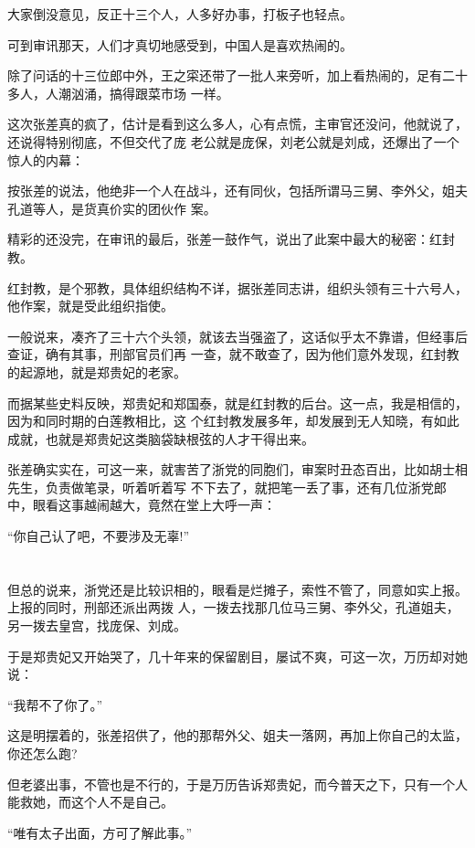 \documentclass[11pt,a4paper,onecolumn]{article}
\begin{document}
大家倒没意见，反正十三个人，人多好办事，打板子也轻点。

可到审讯那天，人们才真切地感受到，中国人是喜欢热闹的。

除了问话的十三位郎中外，王之寀还带了一批人来旁听，加上看热闹的，足有二十多人，人潮汹涌，搞得跟菜市场
一样。

这次张差真的疯了，估计是看到这么多人，心有点慌，主审官还没问，他就说了，还说得特别彻底，不但交代了庞
老公就是庞保，刘老公就是刘成，还爆出了一个惊人的内幕：

按张差的说法，他绝非一个人在战斗，还有同伙，包括所谓马三舅、李外父，姐夫孔道等人，是货真价实的团伙作
案。

精彩的还没完，在审讯的最后，张差一鼓作气，说出了此案中最大的秘密：红封教。

红封教，是个邪教，具体组织结构不详，据张差同志讲，组织头领有三十六号人，他作案，就是受此组织指使。

一般说来，凑齐了三十六个头领，就该去当强盗了，这话似乎太不靠谱，但经事后查证，确有其事，刑部官员们再
一查，就不敢查了，因为他们意外发现，红封教的起源地，就是郑贵妃的老家。

而据某些史料反映，郑贵妃和郑国泰，就是红封教的后台。这一点，我是相信的，因为和同时期的白莲教相比，这
个红封教发展多年，却发展到无人知晓，有如此成就，也就是郑贵妃这类脑袋缺根弦的人才干得出来。

张差确实实在，可这一来，就害苦了浙党的同胞们，审案时丑态百出，比如胡士相先生，负责做笔录，听着听着写
不下去了，就把笔一丢了事，还有几位浙党郎中，眼看这事越闹越大，竟然在堂上大呼一声：

``你自己认了吧，不要涉及无辜!''

\section[\thesection]{}

但总的说来，浙党还是比较识相的，眼看是烂摊子，索性不管了，同意如实上报。上报的同时，刑部还派出两拨
人，一拨去找那几位马三舅、李外父，孔道姐夫，另一拨去皇宫，找庞保、刘成。

于是郑贵妃又开始哭了，几十年来的保留剧目，屡试不爽，可这一次，万历却对她说：

``我帮不了你了。''

这是明摆着的，张差招供了，他的那帮外父、姐夫一落网，再加上你自己的太监，你还怎么跑?

但老婆出事，不管也是不行的，于是万历告诉郑贵妃，而今普天之下，只有一个人能救她，而这个人不是自己。

``唯有太子出面，方可了解此事。''
\end{document}
